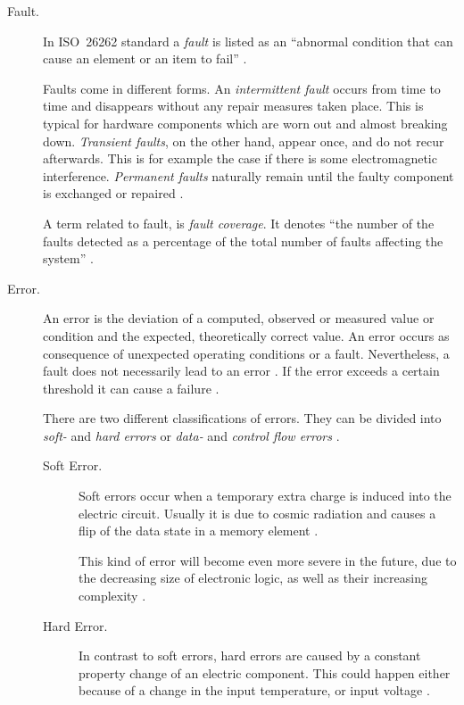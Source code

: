 \begin{description}
\item [Fault.]
In \mbox{ISO 26262} standard a \emph{fault} is listed as an ``abnormal condition that can cause an element or an item to fail'' \cite{iso26262:1} \cite{autosar_glossary}. 

Faults come in different forms. An \emph{intermittent fault} occurs from time to time and disappears without any repair measures taken place. This is typical for hardware components which are worn out and almost breaking down. \emph{Transient faults}, on the other hand, appear once, and do not recur afterwards. This is for example the case if there is some electromagnetic interference. \emph{Permanent faults} naturally remain until the faulty component is exchanged or repaired \cite{iso26262:1}.

A term related to fault, is \emph{fault coverage}. It denotes ``the number of the faults detected as a percentage of the total number of faults affecting the system'' \cite{elattar2007}.


\item [Error.]
An error is the deviation of a computed, observed or measured value or condition and the expected, theoretically correct value. An error occurs as consequence of unexpected operating conditions or a fault.
Nevertheless, a fault does not necessarily lead to an error \cite{iso26262:1} \cite{nelson} \cite{autosar_glossary}. If the error exceeds a certain threshold it can cause a failure \cite{autosar_glossary}.

There are two different classifications of errors. They can be divided into \emph{soft-} and \emph{hard errors} or \emph{data-} and \emph{control flow errors} \cite{israr2014} \cite{elattar2007}.
	\begin{description}
	\item [Soft Error.]
	Soft errors occur when a temporary extra charge is induced into the electric circuit. Usually it is due to cosmic radiation and causes a flip of the data state in a memory element \cite{israr2014} \cite{elattar2007}.

	This kind of error will become even more severe in the future, due to the decreasing size of electronic logic, as well as their increasing complexity \cite{elattar2007}.

	\item [Hard Error.]
	In contrast to soft errors, hard errors are caused by a constant property change of an electric component. This could happen either because of a change in the input temperature, or input voltage \cite{israr2014}.
	\end{description}


\end{description}
